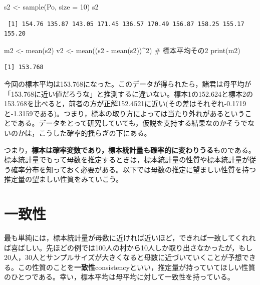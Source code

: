 \documentclass[
  a4paper,
]{ltjsbook}
\newenvironment{Shaded}{\begin{snugshade}}{\end{snugshade}}
\newcommand{\AttributeTok}[1]{\textcolor[rgb]{0.40,0.45,0.13}{#1}}
\newcommand{\CommentTok}[1]{\textcolor[rgb]{0.37,0.37,0.37}{#1}}
\newcommand{\DecValTok}[1]{\textcolor[rgb]{0.68,0.00,0.00}{#1}}
\newcommand{\FunctionTok}[1]{\textcolor[rgb]{0.28,0.35,0.67}{#1}}
\newcommand{\NormalTok}[1]{\textcolor[rgb]{0.00,0.23,0.31}{#1}}
\newcommand{\OtherTok}[1]{\textcolor[rgb]{0.00,0.23,0.31}{#1}}
\newcommand{\SpecialCharTok}[1]{\textcolor[rgb]{0.37,0.37,0.37}{#1}}
\begin{document}
\begin{Shaded}
\begin{Highlighting}[]
\NormalTok{s2 }\OtherTok{\textless{}{-}} \FunctionTok{sample}\NormalTok{(Po, }\AttributeTok{size =} \DecValTok{10}\NormalTok{)}
\NormalTok{s2}
\end{Highlighting}
\end{Shaded}

\begin{verbatim}
 [1] 154.76 135.87 143.05 171.45 136.57 170.49 156.87 158.25 155.17 155.20
\end{verbatim}

\begin{Shaded}
\begin{Highlighting}[]
\NormalTok{m2 }\OtherTok{\textless{}{-}} \FunctionTok{mean}\NormalTok{(s2)}
\NormalTok{v2 }\OtherTok{\textless{}{-}} \FunctionTok{mean}\NormalTok{((s2 }\SpecialCharTok{{-}} \FunctionTok{mean}\NormalTok{(s2))}\SpecialCharTok{\^{}}\DecValTok{2}\NormalTok{)}
\CommentTok{\# 標本平均その2}
\FunctionTok{print}\NormalTok{(m2)}
\end{Highlighting}
\end{Shaded}

\begin{verbatim}
[1] 153.768
\end{verbatim}

今回の標本平均は153.768になった。このデータが得られたら，諸君は母平均が「153.768に近い値だろうな」と推測するに違いない。標本1の152.624と標本2の153.768を比べると，前者の方が正解152.4521に近い(その差はそれぞれ-0.1719と-1.3159である)。つまり，標本の取り方によっては当たり外れがあるということである。データをとって研究していても，仮説を支持する結果なのかそうでないのかは，こうした確率的揺らぎの下にある。

つまり，\textbf{標本は確率変数であり，標本統計量も確率的に変わりうる}ものである。標本統計量でもって母数を推定するときは，標本統計量の性質や標本統計量が従う確率分布を知っておく必要がある。以下では母数の推定に望ましい性質を持つ推定量の望ましい性質をみていこう。

\section{一致性}\label{ux4e00ux81f4ux6027}

最も単純には，標本統計量が母数に近ければ近いほど，できれば一致してくれれば喜ばしい。先ほどの例では100人の村から10人しか取り出さなかったが，もし20人，30人とサンプルサイズが大きくなると母数に近づいていくことが予想できる。この性質のことを\textbf{一致性}consistencyといい，推定量が持っていてほしい性質のひとつである。幸い，標本平均は母平均に対して一致性を持っている。
\end{document}
